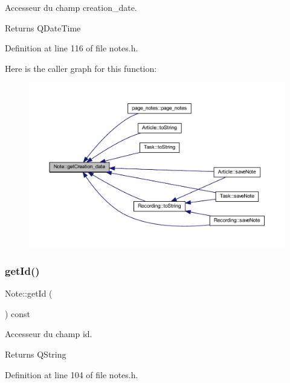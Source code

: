 Accesseur du champ creation\+\_\+date. 

\begin{DoxyReturn}{Returns}
Q\+Date\+Time 
\end{DoxyReturn}


Definition at line 116 of file notes.\+h.

Here is the caller graph for this function\+:\nopagebreak
\begin{figure}[H]
\begin{center}
\leavevmode
\includegraphics[width=350pt]{class_note_a89b9be4eae802c78a0959aa9bd408e41_icgraph}
\end{center}
\end{figure}
\mbox{\label{class_note_afafbebe4aa35b8d29d903bc53fa31929}} 
\subsubsection{\texorpdfstring{get\+Id()}{getId()}}
{\footnotesize\ttfamily Note\+::get\+Id (\begin{DoxyParamCaption}{ }\end{DoxyParamCaption}) const\hspace{0.3cm}{\ttfamily [inline]}}



Accesseur du champ id. 

\begin{DoxyReturn}{Returns}
Q\+String 
\end{DoxyReturn}


Definition at line 104 of file notes.\+h.

